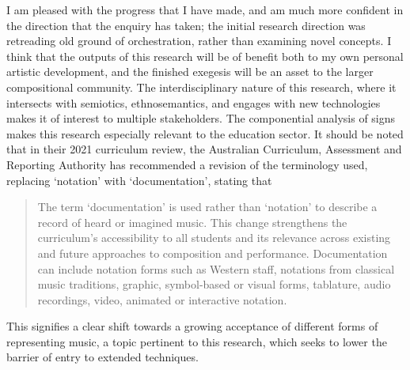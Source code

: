 I am pleased with the progress that I have made, and am much more confident in the direction that the enquiry has taken; the initial research direction was retreading old ground of orchestration, rather than examining novel concepts.
I think that the outputs of this research will be of benefit both to my own personal artistic development, and the finished exegesis will be an asset to the larger compositional community.
The interdisciplinary nature of this research, where it intersects with semiotics, ethnosemantics, and engages with new technologies makes it of interest to multiple stakeholders.
The componential analysis of signs makes this research especially relevant to the education sector.
It should be noted that in their 2021 curriculum review, the Australian Curriculum, Assessment and Reporting Authority has recommended a revision of the terminology used, replacing `notation' with `documentation', stating that \begin{quotation}
    The term ‘documentation’ is used rather than ‘notation’ to describe a record of heard or imagined music. 
    This change strengthens the curriculum’s accessibility to all students and its relevance across existing and future approaches to composition and performance. 
    Documentation can include notation forms such as Western staff, notations from classical music traditions, graphic, symbol-based or visual forms, tablature, audio recordings, video, animated or interactive notation.\autocite[6]{WhatHasChanged2021}
\end{quotation}
This signifies a clear shift towards a growing acceptance of different forms of representing music, a topic pertinent to this research, which seeks to lower the barrier of entry to extended techniques.